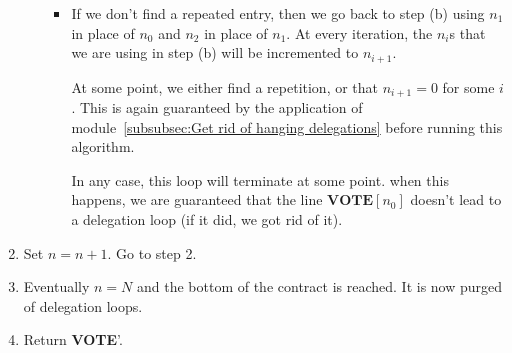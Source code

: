 \documentclass[submission, copyright,creativecommons,sharealike,noncommercial]{eptcs}
\newcommand{\Vote}{\textbf{VOTE}\xspace}
\begin{document}
\begin{enumerate}
\begin{enumerate}
\begin{itemize}
				\item If we don't find a repeated entry, then we go back to step (b) using $n_1$ in place of $n_0$ and $n_2$ in place of $n_1$. At every iteration, the $n_i$s that we are using in step (b) will be incremented to $n_{i+1}$. 
				
				At some point, we either find a repetition, or that $n_{i+1} = 0$ for some $i$. This is again guaranteed by the application of module~\ref{subsubsec:Get rid of hanging delegations} before running this algorithm.
				
				In any case, this loop will terminate at some point. when this happens, we are guaranteed that the line $\Vote[n_0]$ doesn't lead to a delegation loop (if it did, we got rid of it).
			\end{itemize} 
		\end{enumerate}
		\item Set $n = n+1$. Go to step 2.
		\item Eventually $n = N$ and the bottom of the contract is reached. It is now purged of delegation loops.
		\item Return \Vote'.
		
	\end{enumerate}
\end{document}

